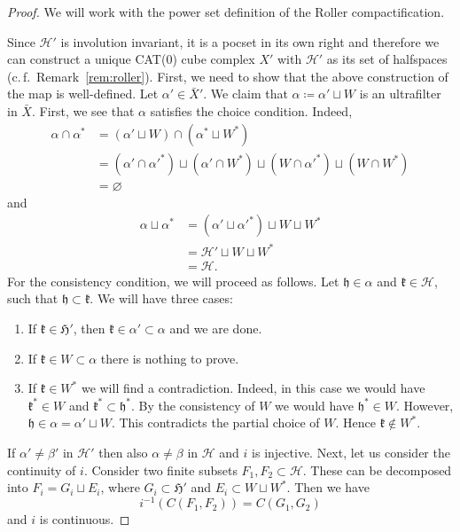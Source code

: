 \begin{proof}
  We will work with the power set definition of the Roller compactification.

  Since \(\mathcal{H}'\) is involution invariant, it is a pocset in its own right and therefore we can construct a unique CAT(0) cube complex \(X'\) with \(\mathcal{H}'\) as its set of halfspaces (c.\,f.\ Remark~\ref{rem:roller}). First, we need to show that the above construction of the map is well-defined. Let \(\alpha' \in \bar X'\). We claim that \(\alpha \coloneqq \alpha' \sqcup W\) is an ultrafilter in \(\bar X\). First, we see that \(\alpha\) satisfies the choice condition. Indeed,
  \begin{align*}
    \alpha \cap \alpha^\ast
    & = (\alpha' \sqcup W) \cap (\alpha^\ast \sqcup W^\ast)\\
    & = (\alpha' \cap \alpha'^\ast) \sqcup (\alpha' \cap W^\ast) \sqcup (W \cap \alpha'^\ast) \sqcup (W \cap W^\ast)\\
    & = \varnothing
  \end{align*}
  and
  \begin{align*}
    \alpha \sqcup \alpha^\ast
    & = (\alpha' \sqcup \alpha'^\ast) \sqcup W \sqcup W^\ast\\
    & = \mathcal{H}' \sqcup W \sqcup W^\ast\\
    & = \mathcal{H}.
  \end{align*}
  For the consistency condition, we will proceed as follows. Let \(\mathfrak{h} \in \alpha\) and \(\mathfrak{k} \in \mathcal{H}\), such that \(\mathfrak{h} \subset \mathfrak{k}\). We will have three cases:
  \begin{enumerate}
  \item If \(\mathfrak{k} \in \mathfrak{H}'\), then \(\mathfrak{k} \in \alpha' \subset \alpha\) and we are done.
  \item If \(\mathfrak{k} \in W \subset \alpha\) there is nothing to prove.
  \item If \(\mathfrak{k} \in W^\ast\) we will find a contradiction. Indeed, in this case we would have \(\mathfrak{k}^\ast \in W\) and \(\mathfrak{k}^\ast \subset \mathfrak{h}^\ast\). By the consistency of \(W\) we would have \(\mathfrak{h}^\ast \in W\). However, \(\mathfrak{h} \in \alpha = \alpha' \sqcup W\). This contradicts the partial choice of \(W\). Hence \(\mathfrak{k} \notin W^\ast\).
  \end{enumerate}

  If \(\alpha' \neq \beta'\) in \(\mathcal{H}'\) then also \(\alpha \neq \beta\) in \(\mathcal{H}\) and \(i\) is injective. Next, let us consider the continuity of \(i\). Consider two finite subsets \(F_1, F_2 \subset \mathcal{H}\). These can be decomposed into \(F_i = G_i \sqcup E_i\), where \(G_i \subset \mathfrak{H}'\) and \(E_i \subset W \sqcup W^\ast\). Then we have
  \[
    i^{-1}(C(F_1, F_2)) = C(G_1, G_2)
  \]
  and \(i\) is continuous.


\end{proof}
